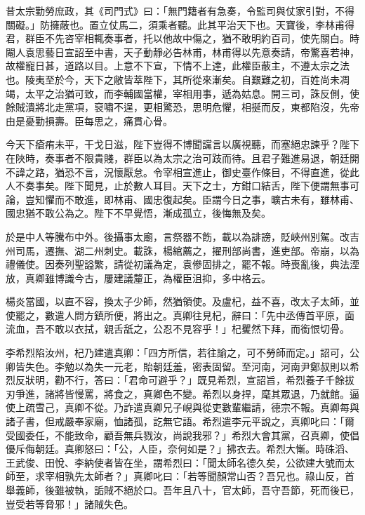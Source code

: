 \begin{pinyinscope}
 昔太宗勤勞庶政，其《司門式》曰：「無門籍者有急奏，令監司與仗家引對，不得關礙。」防擁蔽也。置立仗馬二，須乘者聽。此其平治天下也。天寶後，李林甫得君，群臣不先咨宰相輒奏事者，托以他故中傷之，猶不敢明約百司，使先關白。時閹人袁思藝日宣詔至中書，天子動靜必告林甫，林甫得以先意奏請，帝驚喜若神，故權寵日甚，道路以目。上意不下宣，下情不上達，此權臣蔽主，不遵太宗之法也。陵夷至於今，天下之敝皆萃陛下，其所從來漸矣。自艱難之初，百姓尚未凋竭，太平之治猶可致，而李輔國當權，宰相用事，遞為姑息。開三司，誅反側，使餘賊潰將北走黨項，裒嘯不逞，更相驚恐，思明危懼，相挻而反，東都陷沒，先帝由是憂勤損壽。臣每思之，痛貫心骨。



 今天下瘡痏未平，干戈日滋，陛下豈得不博聞讜言以廣視聽，而塞絕忠諫乎？陛下在陜時，奏事者不限貴賤，群臣以為太宗之治可跂而待。且君子難進易退，朝廷開不諱之路，猶恐不言，況懷厭怠。令宰相宣進止，御史臺作條目，不得直進，從此人不奏事矣。陛下聞見，止於數人耳目。天下之士，方鉗口結舌，陛下便謂無事可論，豈知懼而不敢進，即林甫、國忠復起矣。臣謂今日之事，曠古未有，雖林甫、國忠猶不敢公為之。陛下不早覺悟，漸成孤立，後悔無及矣。



 於是中人等騰布中外。後攝事太廟，言祭器不飭，載以為誹謗，貶峽州別駕。改吉州司馬，遷撫、湖二州刺史。載誅，楊綰薦之，擢刑部尚書，進吏部。帝崩，以為禮儀使。因奏列聖謚繁，請從初議為定，袁傪固排之，罷不報。時喪亂後，典法湮放，真卿雖博識今古，屢建議釐正，為權臣沮抑，多中格云。



 楊炎當國，以直不容，換太子少師，然猶領使。及盧杞，益不喜，改太子太師，並使罷之，數遣人問方鎮所便，將出之。真卿往見杞，辭曰：「先中丞傳首平原，面流血，吾不敢以衣拭，親舌舐之，公忍不見容乎！」杞矍然下拜，而銜恨切骨。



 李希烈陷汝州，杞乃建遣真卿：「四方所信，若往諭之，可不勞師而定。」詔可，公卿皆失色。李勉以為失一元老，貽朝廷羞，密表固留。至河南，河南尹鄭叔則以希烈反狀明，勸不行，答曰：「君命可避乎？」既見希烈，宣詔旨，希烈養子千餘拔刃爭進，諸將皆慢罵，將食之，真卿色不變。希烈以身捍，麾其眾退，乃就館。逼使上疏雪己，真卿不從。乃詐遣真卿兄子峴與從吏數輩繼請，德宗不報。真卿每與諸子書，但戒嚴奉家廟，恤諸孤，訖無它語。希烈遣李元平說之，真卿叱曰：「爾受國委任，不能致命，顧吾無兵戮汝，尚說我邪？」希烈大會其黨，召真卿，使倡優斥侮朝廷。真卿怒曰：「公，人臣，奈何如是？」拂衣去。希烈大慚。時硃滔、王武俊、田悅、李納使者皆在坐，謂希烈曰：「聞太師名德久矣，公欲建大號而太師至，求宰相孰先太師者？」真卿叱曰：「若等聞顏常山否？吾兄也。祿山反，首舉義師，後雖被執，詬賊不絕於口。吾年且八十，官太師，吾守吾節，死而後已，豈受若等脅邪！」諸賊失色。




\end{pinyinscope}
